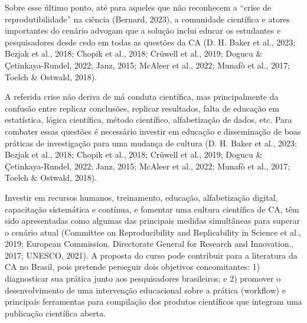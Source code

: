 \documentclass[
  a4paper,
]{book}
\begin{document}
Sobre esse último ponto, até para aqueles que não reconhecem a ``crise
de reprodutibilidade'' na ciência (Bernard, 2023), a comunidade
científica e atores importantes do cenário advogam que a solução inclui
educar os estudantes e pesquisadores desde cedo em todas as questões da
CA (D. H. Baker et al., 2023; Bezjak et al., 2018; Chopik et al., 2018;
Crüwell et al., 2019; Dogucu \& Çetinkaya-Rundel, 2022; Janz, 2015;
McAleer et al., 2022; Munafò et al., 2017; Toelch \& Ostwald, 2018).

A referida crise não deriva de má conduta científica, mas principalmente
da confusão entre replicar conclusões, replicar resultados, falta de
educação em estatística, lógica científica, método científico,
alfabetização de dados, etc. Para combater essas questões é necessário
investir em educação e disseminação de boas práticas de investigação
para uma mudança de cultura (D. H. Baker et al., 2023; Bezjak et al.,
2018; Chopik et al., 2018; Crüwell et al., 2019; Dogucu \&
Çetinkaya-Rundel, 2022; Janz, 2015; McAleer et al., 2022; Munafò et al.,
2017; Toelch \& Ostwald, 2018).

Investir em recursos humanos, treinamento, educação, alfabetização
digital, capacitação sistemática e contínua, e fomentar uma cultura
científica de CA, têm sido apresentadas como algumas das principais
medidas simultâneas para superar o cenário atual (Committee on
Reproducibility and Replicability in Science et al., 2019; European
Commission. Directorate General for Research and Innovation., 2017;
UNESCO, 2021). A proposta do curso pode contribuir para a literatura da
CA no Brasil, pois pretende perseguir dois objetivos concomitantes: 1)
diagnosticar sua prática junto aos pesquisadores brasileiros; e 2)
promover o desenvolvimento de uma intervenção educacional sobre a
prática (workflow) e principais ferramentas para compilação dos produtos
científicos que integram uma publicação científica aberta.
\end{document}
